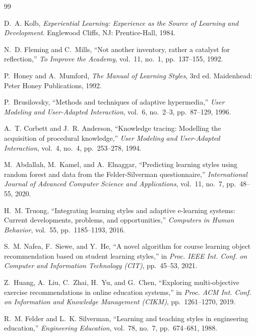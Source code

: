 \documentclass[12pt,a4paper]{article}
\begin{document}
\newpage
\begin{thebibliography}{99}

D.~A. Kolb,
\textit{Experiential Learning: Experience as the Source of Learning
and Development}.
Englewood Cliffs, NJ: Prentice-Hall, 1984.

N.~D. Fleming and C.~Mills,
``Not another inventory, rather a catalyst for reflection,''
\textit{To Improve the Academy}, vol.~11, no.~1, pp.~137--155,
1992.

P.~Honey and A.~Mumford,
\textit{The Manual of Learning Styles}, 3rd ed.
Maidenhead: Peter Honey Publications, 1992.

P.~Brusilovsky,
``Methods and techniques of adaptive hypermedia,''
\textit{User Modeling and User-Adapted Interaction}, vol.~6,
no.~2--3, pp.~87--129, 1996.

A.~T. Corbett and J.~R. Anderson,
``Knowledge tracing: Modelling the acquisition of procedural
knowledge,''
\textit{User Modeling and User-Adapted Interaction}, vol.~4,
no.~4, pp.~253--278, 1994.

M.~Abdallah, M.~Kamel, and A.~Elnaggar,
``Predicting learning styles using random forest and data from the
Felder-Silverman questionnaire,''
\textit{International Journal of Advanced Computer Science and
Applications}, vol.~11, no.~7, pp.~48--55, 2020.

H.~M. Truong,
``Integrating learning styles and adaptive e-learning systems:
Current developments, problems, and opportunities,''
\textit{Computers in Human Behavior}, vol.~55,
pp.~1185--1193, 2016.

S.~M. Nafea, F.~Siewe, and Y.~He,
``A novel algorithm for course learning object recommendation based
on student learning styles,''
in \textit{Proc. IEEE Int. Conf. on Computer and Information
Technology (CIT)}, pp.~45--53, 2021.

Z.~Huang, A.~Liu, C.~Zhai, H.~Yu, and G.~Chen,
``Exploring multi-objective exercise recommendations in online
education systems,''
in \textit{Proc. ACM Int. Conf. on Information and Knowledge
Management (CIKM)}, pp.~1261--1270, 2019.

R.~M. Felder and L.~K. Silverman,
``Learning and teaching styles in engineering education,''
\textit{Engineering Education}, vol.~78, no.~7,
pp.~674--681, 1988.


\end{thebibliography}
\end{document}
